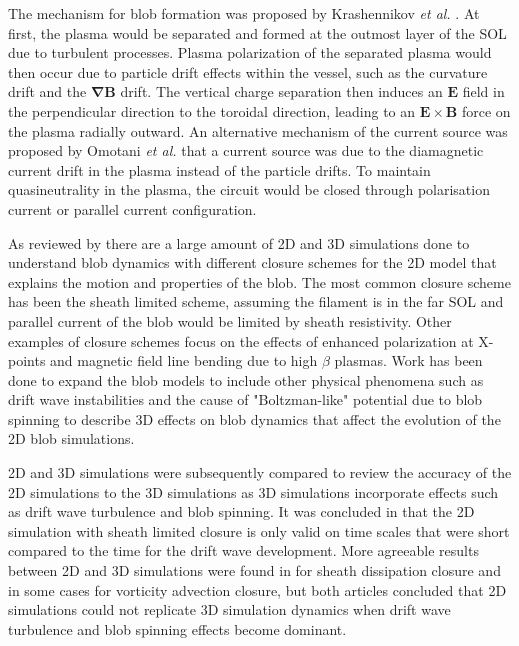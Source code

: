 \documentclass{article}
\begin{document}
The mechanism for blob formation was proposed by Krashennikov \textit{et al.} \cite{krasheninnikov_recent_2008, krasheninnikov_scrape_2001}. At first, the plasma would be separated and formed at the outmost layer of the SOL due to turbulent processes. Plasma polarization of the separated plasma would then occur due to particle drift effects within the vessel, such as the curvature drift and the $\bm{\nabla B}$ drift. The vertical charge separation then induces an $\bm{E}$ field in the perpendicular direction to the toroidal direction, leading to an $\bm{E}\times\bm{B}$ force on the plasma radially outward. An alternative mechanism of the current source was proposed by Omotani \textit{et al.} that a current source was due to the diamagnetic current drift in the plasma instead of the particle drifts. To maintain quasineutrality in the plasma, the circuit would be closed through polarisation current or parallel current configuration.

As reviewed by \cite{dippolito_convective_2011} there are a large amount of  2D and 3D simulations done to understand blob dynamics with different closure schemes for the 2D model that explains the motion and properties of the blob. The most common closure scheme has been the  sheath limited scheme, assuming the filament is in the far SOL and parallel current of the blob would be limited by sheath resistivity. Other examples of closure schemes focus on the effects of enhanced polarization at X-points and magnetic field line bending due to high $\beta$ plasmas\cite{krasheninnikov_recent_2008}. Work has been done to expand the blob models to include other physical phenomena such as drift wave instabilities \cite{angus_effect_2012} and the cause of "Boltzman-like" potential due to blob spinning \cite{angus_effects_2012} to describe 3D effects on blob dynamics that affect the evolution of the 2D blob simulations.

2D and 3D simulations were subsequently compared to review the accuracy of the 2D simulations to the 3D simulations as 3D simulations incorporate effects such as drift wave turbulence and blob spinning. It was concluded in \cite{angus_3d_2012}that the 2D simulation with sheath limited closure is only valid on time scales that were short compared to the time for the drift wave development. More agreeable results between 2D and 3D simulations were found in \cite{easy_three_2014} for sheath dissipation closure and in some cases for vorticity advection closure, but both articles concluded that 2D simulations could not replicate 3D simulation dynamics when drift wave turbulence and blob spinning effects become dominant.
\end{document}
